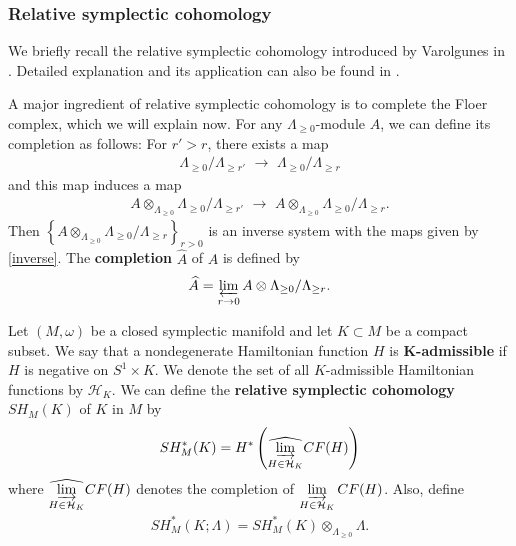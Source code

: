\documentclass[12pt]{amsart}
\theoremstyle{definition}
\newcommand{\ton}{{\otimes_{\Lambda_{\geq 0}}}}
\newcommand{\lr}{{\,\,\longrightarrow\,\,}}
\begin{document}
\vspace{0.2 cm}

\subsubsection{Relative symplectic cohomology}
We briefly recall the relative symplectic cohomology introduced by Varolgunes in \cite{v}. Detailed explanation and its application can also be found in \cite{a, a2, dgpz, msv, sun}. 

\vspace{0.2 cm}

A major ingredient of relative symplectic cohomology is to complete the Floer complex, which we will explain now. For any $\Lambda_{\geq0}$-module $A$, we can define its completion as follows: For $r' >r$, there exists a map 
\begin{align*}
    \Lambda_{\geq 0} / \Lambda_{\geq r'} \lr \Lambda_{\geq 0} / \Lambda_{\geq r} 
\end{align*}
and this map induces a map
\begin{align}\label{inverse}
    A \ton \Lambda_{\geq 0} / \Lambda_{\geq r'} \lr A \ton \Lambda_{\geq 0} / \Lambda_{\geq r}.
\end{align}
Then $\left\{ A \ton \Lambda_{\geq 0} / \Lambda_{\geq r} \right\}_{r>0}$ is an inverse system with the maps given by \eqref{inverse}. The \textbf{completion} $\widehat{A}$ of $A$ is defined by
\begin{align*}
    \widehat{A} = \varprojlim_{r \to 0} A \otimes \Lambda_{\geq 0} / \Lambda_{\geq r}.
\end{align*}


\vspace{0.2 cm}

Let $(M, \omega)$ be a closed symplectic manifold and let $K \subset M$ be a compact subset. We say that a nondegenerate Hamiltonian function $H$ is \textbf{K-admissible} if $H$ is negative on $S^1 \times K$. We denote the set of all $K$-admissible Hamiltonian functions by $\mathcal{H}_K$. We can define the \textbf{relative symplectic cohomology} $SH_M(K)$ of $K$ in $M$ by
\begin{align}\label{reldef}
    SH^*_M(K) = H^* \left( \widehat{\varinjlim_{H \in \mathcal{H}_K}} CF(H) \right)
\end{align}
where $\displaystyle\widehat{\varinjlim_{H \in \mathcal{H}_K}} CF(H)$ denotes the completion of $\displaystyle\varinjlim_{H \in \mathcal{H}_K} CF(H)$. Also, define 
\begin{align*}
    SH^*_M(K; \Lambda) = SH^*_M(K)\ton \Lambda.
\end{align*}
\end{document}
